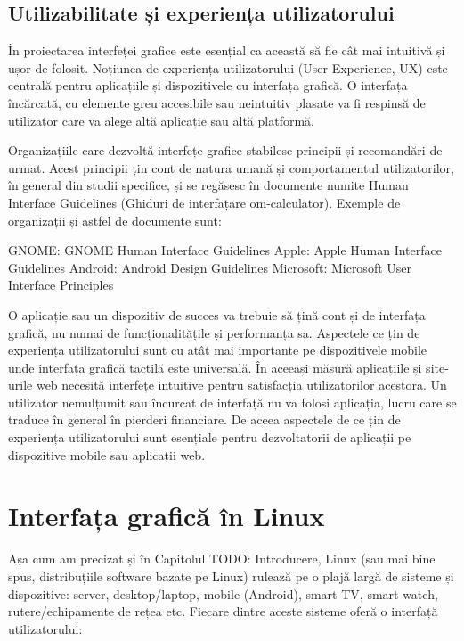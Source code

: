 \subsection{Utilizabilitate și experiența utilizatorului}
\label{sec:ui:ux}

În proiectarea interfeței grafice este esențial ca această să fie cât mai intuitivă și ușor de folosit. Noțiunea de experiența utilizatorului (User Experience, UX) este centrală pentru aplicațiile și dispozitivele cu interfața grafică. O interfața încărcată, cu elemente greu accesibile sau neintuitiv plasate va fi respinsă de utilizator care va alege altă aplicație sau altă platformă.

Organizațiile care dezvoltă interfețe grafice stabilesc principii și recomandări de urmat. Acest principii țin cont de natura umană și comportamentul utilizatorilor, în general din studii specifice, și se regăsesc în documente numite Human Interface Guidelines (Ghiduri de interfațare om-calculator). Exemple de organizații și astfel de documente sunt:

GNOME: GNOME Human Interface Guidelines
Apple: Apple Human Interface Guidelines
Android: Android Design Guidelines
Microsoft: Microsoft User Interface Principles

O aplicație sau un dispozitiv de succes va trebuie să țină cont și de interfața grafică, nu numai de funcționalitățile și performanța sa. Aspectele ce țin de experiența utilizatorului sunt cu atât mai importante pe dispozitivele mobile unde interfața grafică tactilă este universală. În aceeași măsură aplicațiile și site-urile web necesită interfețe intuitive pentru satisfacția utilizatorilor acestora. Un utilizator nemulțumit sau încurcat de interfață nu va folosi aplicația, lucru care se traduce în general în pierderi financiare. De aceea aspectele de ce țin de experiența utilizatorului sunt esențiale pentru dezvoltatorii de aplicații pe dispozitive mobile sau aplicații web.

\section{Interfața grafică în Linux}
\label{sec:ui:linux-gui}

Așa cum am precizat și în Capitolul TODO: Introducere, Linux (sau mai bine spus, distribuțiile software bazate pe Linux) rulează pe o plajă largă de sisteme și dispozitive: server, desktop/laptop, mobile (Android), smart TV, smart watch, rutere/echipamente de rețea etc. Fiecare dintre aceste sisteme oferă o interfață utilizatorului:

